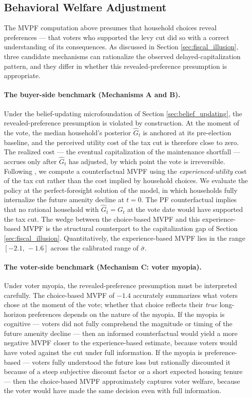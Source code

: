 \subsection{Behavioral Welfare Adjustment}

The MVPF computation above presumes that household choices reveal preferences --- that voters who supported the levy cut did so with a correct understanding of its consequences. As discussed in Section \ref{sec:fiscal_illusion}, three candidate mechanisms can rationalize the observed delayed-capitalization pattern, and they differ in whether this revealed-preference presumption is appropriate.

\paragraph{The buyer-side benchmark (Mechanisms A and B).}
Under the belief-updating microfoundation of Section \ref{sec:belief_updating}, the revealed-preference presumption is violated by construction. At the moment of the vote, the median household's posterior $\hat{G}_t$ is anchored at its pre-election baseline, and the perceived utility cost of the tax cut is therefore close to zero. The realized cost --- the eventual capitalization of the maintenance shortfall --- accrues only after $\hat{G}_t$ has adjusted, by which point the vote is irreversible. Following \cite{chetty2009salience}, we compute a counterfactual MVPF using the {\it experienced-utility} cost of the tax cut rather than the cost implied by household choices. We evaluate the policy at the perfect-foresight solution of the model, in which households fully internalize the future amenity decline at $t = 0$. The PF counterfactual implies that no rational household with $\hat{G}_t = G_t$ at the vote date would have supported the tax cut. The wedge between the choice-based MVPF and this experience-based MVPF is the structural counterpart to the capitalization gap of Section \ref{sec:fiscal_illusion}. Quantitatively, the experience-based MVPF lies in the range $[-2.1,\, -1.6]$ across the calibrated range of $\bar{\sigma}$.

\paragraph{The voter-side benchmark (Mechanism C: voter myopia).}
Under voter myopia, the revealed-preference presumption must be interpreted carefully. The choice-based MVPF of $-1.4$ accurately summarizes what voters chose at the moment of the vote; whether that choice reflects their {\it true} long-horizon preferences depends on the nature of the myopia. If the myopia is cognitive --- voters did not fully comprehend the magnitude or timing of the future amenity decline --- then an informed counterfactual would yield a more negative MVPF closer to the experience-based estimate, because voters would have voted against the cut under full information. If the myopia is preference-based --- voters fully understood the future loss but rationally discounted it because of a steep subjective discount factor or a short expected housing tenure --- then the choice-based MVPF approximately captures voter welfare, because the voter would have made the same decision even with full information.

